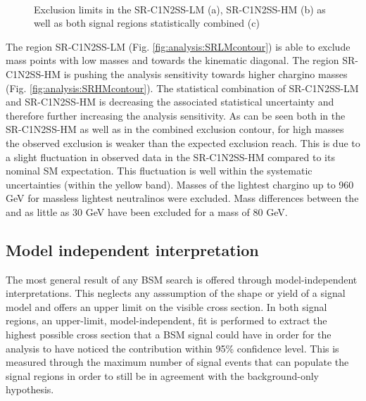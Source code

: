 \begin{figure}[htpb!]
\centering
{}
\\
\caption{Exclusion limits in the SR-C1N2SS-LM  (a),  SR-C1N2SS-HM (b) as well as both signal regions statistically combined (c)} 
\end{figure}
The region SR-C1N2SS-LM (Fig. \ref{fig:analysis:SRLMcontour}) is able to exclude mass points with low masses and towards the kinematic diagonal.  The region SR-C1N2SS-HM is pushing the analysis sensitivity towards higher chargino masses (Fig.  \ref{fig:analysis:SRHMcontour}). 
The statistical combination of SR-C1N2SS-LM and SR-C1N2SS-HM is decreasing the associated statistical uncertainty and therefore further increasing the analysis sensitivity.  
As can be seen both in the SR-C1N2SS-HM as well as in the combined exclusion contour, for high \Cone masses the observed exclusion is weaker than the expected exclusion reach.  This is due to a slight fluctuation in observed data in the SR-C1N2SS-HM compared to its nominal \ac{SM} expectation.  This fluctuation is well within the systematic uncertainties (within the yellow band). 
Masses of the lightest chargino up to 960 GeV for massless lightest neutralinos were excluded.  Mass differences between the \Cone and \Ntwo as little as 30 GeV have been excluded for a \Cone mass of 80 GeV.  

\FloatBarrier
\subsection{Model independent interpretation}

The most general result of any \ac{BSM} search is offered through model-independent interpretations.  This neglects any asssumption of the shape or yield of a signal model and offers an upper limit on the visible cross section. 
In both signal regions,  an upper-limit,  model-independent,  fit is performed to extract the highest possible cross section that a \ac{BSM} signal could have in order for the analysis to have noticed the contribution within 95\% confidence level. 
This is measured through the maximum number of signal events that can populate the signal regions in order to still be in agreement with the background-only hypothesis. 

